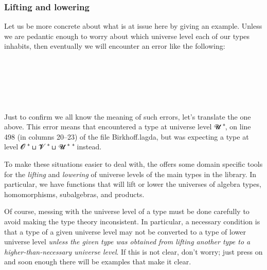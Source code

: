 \subsubsection{Lifting and lowering}\label{lifting-and-lowering}
Let us be more concrete about what is at issue here by giving an example. Unless we are pedantic enough to worry about which universe level each of our types inhabits, then eventually we will encounter an error like the following:\\
\\
\\
\\
\\
\\
\\
Just to confirm we all know the meaning of such errors, let's translate the one above. This error means that \agda encountered a type at universe level \ab 𝓤 \af ⁺, on line 498 (in columns 20--23) of the file Birkhoff.lagda, but was expecting a type at level \ab 𝓞 \af ⁺ \af ⊔ \ab 𝓥 \af ⁺ \af ⊔ \ab 𝓤 \af ⁺ \af ⁺ instead.

To make these situations easier to deal with, the \ualib offers some domain specific tools for the \emph{lifting} and \emph{lowering} of universe levels of the main types in the library. In particular, we have functions that will lift or lower the universes of algebra types, homomorphisms, subalgebras, and products.

Of course, messing with the universe level of a type must be done carefully to avoid making the type theory inconsistent.  In particular, a necessary condition is that a type of a given universe level may not be converted to a type of lower universe level \emph{unless the given type was obtained from lifting another type to a higher-than-necessary universe level}.  If this is not clear, don't worry; just press on and soon enough there will be examples that make it clear.


